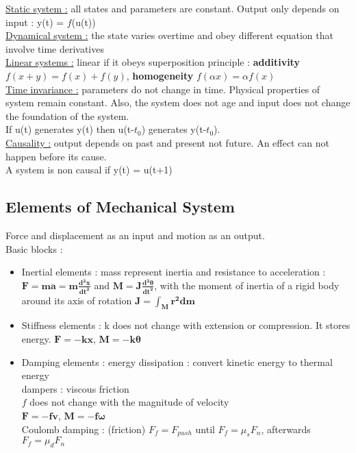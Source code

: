 \documentclass[../main.tex]{subfiles}
\begin{document}
\underline{Static system :} all states and parameters are constant. Output only depends on input : y(t) = $f$(u(t))\\

\underline{Dynamical system :} the state varies overtime and obey different equation that involve time derivatives\\

\underline{Linear systems :} linear if it obeys superposition principle : \textbf{additivity} $f(x+y) = f(x)+f(y)$, \textbf{homogeneity} $f(\alpha x) = \alpha f(x)$\\

\underline{Time invariance :} parameters do not change in time. Physical properties of system remain constant. Also, the system does not age and input does not change the foundation of the system.\\
If u(t) generates y(t) then u(t-$t_0$) generates y(t-$t_0$).\\

\underline{Causality :} output depends on past and present not future. An effect can not happen before its cause.\\
A system is non causal if y(t) = u(t+1)\\

\subsection{Elements of Mechanical System}
Force and displacement as an input and motion as an output.\\
Basic blocks : \\
\begin{itemize}
    \item Inertial elements : mass represent inertia and resistance to acceleration : \\
    $\mathbf{F=ma = m\frac{d^2x}{dt^2}}$ and $\mathbf{M = J \frac{d^2 \theta}{dt^2}}$, with the moment of inertia of a rigid body around its axis of rotation $\mathbf{J = \int_M r^2dm}$\\
    \item Stiffness elements : k does not change with extension or compression. It stores energy. $\mathbf{F=-kx}$, $\mathbf{M=-k\theta}$\\
    \item Damping elements : energy dissipation : convert kinetic energy to thermal energy\\
    dampers : viscous friction\\
    $f$ does not change with the magnitude of velocity\\
    $\mathbf{F = -fv}$, $\mathbf{M=-f\omega}$\\
    Coulomb damping : (friction) $F_f = F_{push}$ until $F_f = \mu_s F_n$, afterwards $F_f = \mu_d F_n$\\
\end{itemize}
\end{document}
